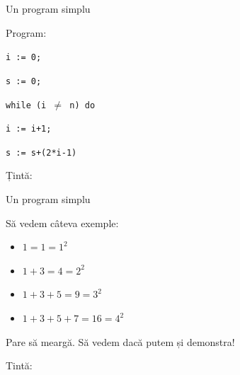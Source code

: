 \begin{frame}{Un program simplu}
\begin{example}

Program:

\hspace{.5cm} \texttt{i := 0;}

\hspace{.5cm} \texttt{s := 0;}

\hspace{.5cm} \texttt{while (i $\neq$ n) do}

\hspace{.8cm} \texttt{i := i+1;}

\hspace{.8cm} \texttt{s := s+(2*i-1)}

\medskip
Țintă: 
\end{example}
\end{frame}

\begin{frame}{Un program simplu}
\begin{example}[cont.]
Să vedem câteva exemple:
\begin{itemize}
	\item $1 = 1 = 1^2$
	\item $1 + 3 = 4 = 2^2$
	\item $1 + 3 + 5 = 9 = 3^2$
	\item $1 + 3 + 5 + 7 = 16 = 4^2$
\end{itemize}

Pare să meargă. Să vedem dacă putem și demonstra!

\medskip
Tintă: 
\end{example}
\end{frame}

